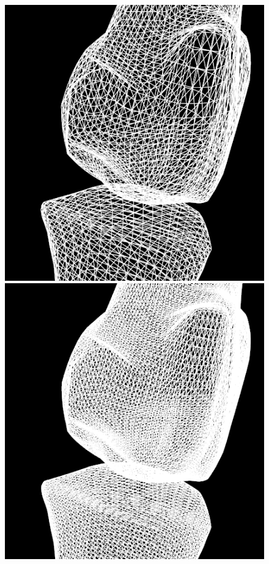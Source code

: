 \documentclass[10pt, conference, compsocconf]{IEEEtran}
\begin{document}
\begin{figure}[htbp]
{\begin{minipage}[h]{0.16\linewidth}
        \includegraphics[width=\textwidth]{./Figure/footbones/fingerBones/weight22-.png}\\
        \includegraphics[width=\textwidth]{./Figure/footbones/fingerBones/weight23-.png}\vspace{1ex}\\

\end{minipage}}
\end{figure}
\end{document}
